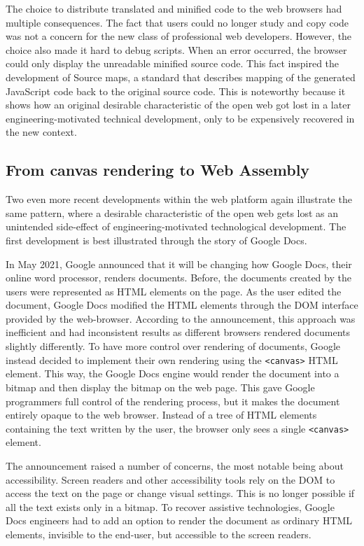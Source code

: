 The choice to distribute translated and minified code to the web browsers had multiple consequences.
The fact that users could no longer study and copy code was not a concern for the new class of
professional web developers. However, the choice also made it hard to debug scripts. When an error
occurred, the browser could only display the unreadable minified source code.  This fact inspired
the development of Source maps, a standard that describes mapping
of the generated JavaScript code back to the original source code.
This is noteworthy because it shows how an original desirable characteristic of
the open web got lost in a later engineering-motivated technical development, only to be
expensively recovered in the new context.

\subsection{From canvas rendering to Web Assembly}
Two even more recent developments within the web platform again illustrate the same pattern,
where a desirable characteristic of the open web gets lost as an unintended side-effect
of engineering-motivated technological development. The first development is best illustrated
through the story of Google Docs.

In May 2021, Google announced that it will be changing how Google Docs, their online word processor,
renders documents. Before, the documents created by the users were represented as HTML elements
on the page. As the user edited the document, Google Docs modified the HTML elements through the
DOM interface provided by the web-browser. According to the announcement, this approach was
inefficient and had inconsistent results as different browsers rendered documents slightly
differently. To have more control over rendering of documents, Google instead decided to implement
their own rendering using the \texttt{<canvas>} HTML element. This way, the Google Docs
engine would render the document into a bitmap and then display the bitmap on the web page.
This gave Google programmers full control of the rendering process, but it makes the document
entirely opaque to the web browser. Instead of a tree of HTML elements containing the text
written by the user, the browser only sees a single \texttt{<canvas>} element.

The announcement raised a number of concerns, the most notable being about accessibility.
Screen readers and other accessibility tools rely on the DOM to access the text on the page
or change visual settings. This is no longer possible if all the text exists only in a bitmap.
To recover assistive technologies, Google Docs engineers had to add an option to render the
document as ordinary HTML elements, invisible to the end-user, but accessible to the
screen readers.

